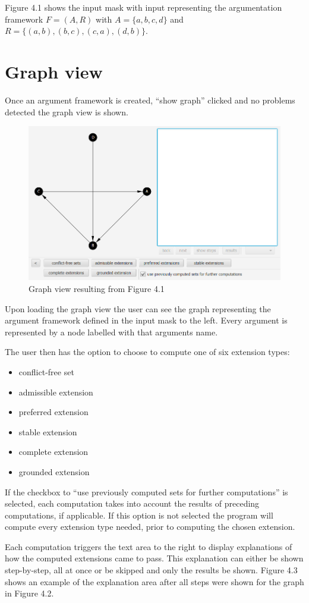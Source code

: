 \documentclass[draft,final]{vutinfth} %
\newcommand{\hl}{\par\medskip}
\begin{document}
Figure 4.1 shows the input mask with input representing the argumentation framework $F=(A,R)$ with $A=\{a,b,c,d\}$ and $R=\{(a,b),(b,c),(c,a),(d,b)\}$.

\section{Graph view}
Once an argument framework is created, ``show graph'' clicked and no problems detected the graph view is shown.

\FloatBarrier
	\begin{figure}[!htb]
		\centering
		\includegraphics[width=\linewidth]{pics/demo.png}
		\caption{Graph view resulting from Figure 4.1}
	\end{figure}
\FloatBarrier

Upon loading the graph view the user can see the graph representing the argument framework defined in the input mask to the left. Every argument is represented by a node labelled with that arguments name.\hl
The user then has the option to choose to compute one of six extension types:

\begin{itemize}[noitemsep]
	\item conflict-free set
	\item admissible extension
	\item preferred extension
	\item stable extension
	\item complete extension
	\item grounded extension
\end{itemize}

If the checkbox to ``use previously computed sets for further computations'' is selected, each computation takes into account the results of preceding computations, if applicable. If this option is not selected the program will compute every extension type needed, prior to computing the chosen extension.\hl
Each computation triggers the text area to the right to display explanations of how the computed extensions came to pass. This explanation can either be shown step-by-step, all at once or be skipped and only the results be shown. Figure 4.3 shows an example of the explanation area after all steps were shown for the graph in Figure 4.2.
\end{document}
